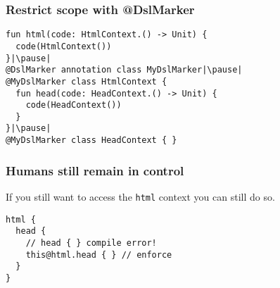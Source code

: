 \begin{frame}[fragile] \frametitle{Restrict scope with @DslMarker}
\begin{lstlisting}
fun html(code: HtmlContext.() -> Unit) {
  code(HtmlContext())
}|\pause|
@DslMarker annotation class MyDslMarker|\pause|
@MyDslMarker class HtmlContext {
  fun head(code: HeadContext.() -> Unit) {
    code(HeadContext())
  }
}|\pause|
@MyDslMarker class HeadContext { }
\end{lstlisting}
\end{frame}

\begin{frame}[fragile] \frametitle{Humans still remain in control}
If you still want to access the \texttt{html} context you can still do so.
\begin{lstlisting}
html {
  head {
    // head { } compile error!
    this@html.head { } // enforce
  }
}
\end{lstlisting}
\end{frame}

